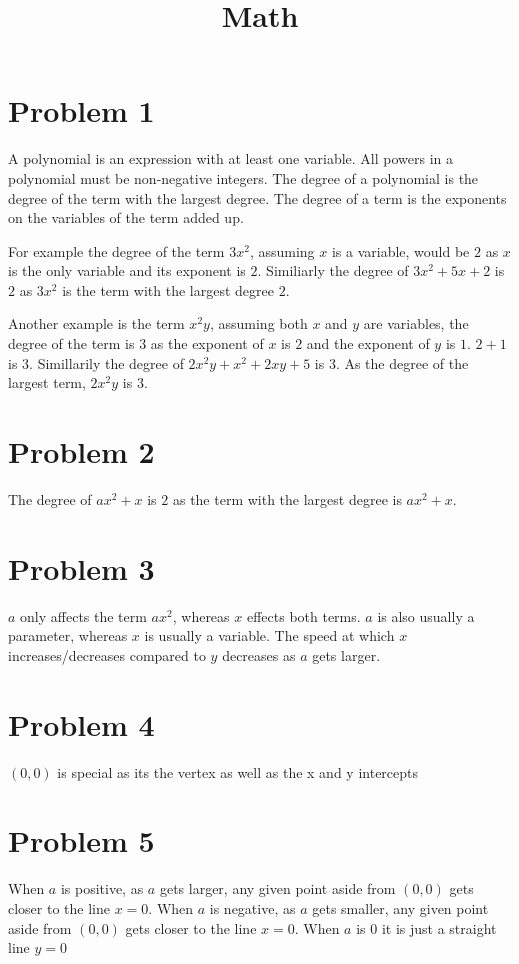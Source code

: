 \documentclass[12pt, letterpaper, twoside]{article}
\title{Math}
\begin{document}
	
	\maketitle
\section{Problem 1}
A polynomial is an expression with at least one variable. All powers in a polynomial must be non-negative integers. The degree of a polynomial is the degree of the term with the largest degree. The degree of a term is the exponents on the variables of the term added up.\par
For example the degree of the term $3x^2$, assuming $x$ is a variable, would be $2$ as $x$ is the only variable and its exponent is $2$. Similiarly the degree of $3x^2 + 5x +2$ is $2$ as $3x^2$ is the term with the largest degree $2$. \par
Another example is the term $x^2y$, assuming both $x$ and $y$ are variables, the degree of the term is $3$ as the exponent of $x$ is $2$ and the exponent of $y$ is $1$. $2 + 1$ is $3$. Simillarily the degree of $2x^2y + x^2 + 2xy + 5$ is $3$. As the degree of the largest term, $2x^2y$ is $3$. 
\section{Problem 2}
The degree of $ax^2 + x$ is $2$ as the term with the largest degree is $ax^2 + x$.
\section{Problem 3}
$a$ only affects the term $ax^2$, whereas $x$ effects both terms. $a$ is also usually a parameter, whereas $x$ is usually a variable. The speed at which $x$ increases/decreases compared to $y$ decreases as $a$ gets larger.
\section{Problem 4}
$(0,0)$ is special as its the vertex as well as the x and y intercepts
\section{Problem 5}
When $a$ is positive, as $a$ gets larger, any given point aside from $(0,0)$ gets closer to the line $x = 0$. When $a$ is negative, as $a$ gets smaller, any given point aside from $(0,0)$ gets closer to the line $x = 0$. When $a$ is $0$ it is just a straight line $y=0$
\end{document}
